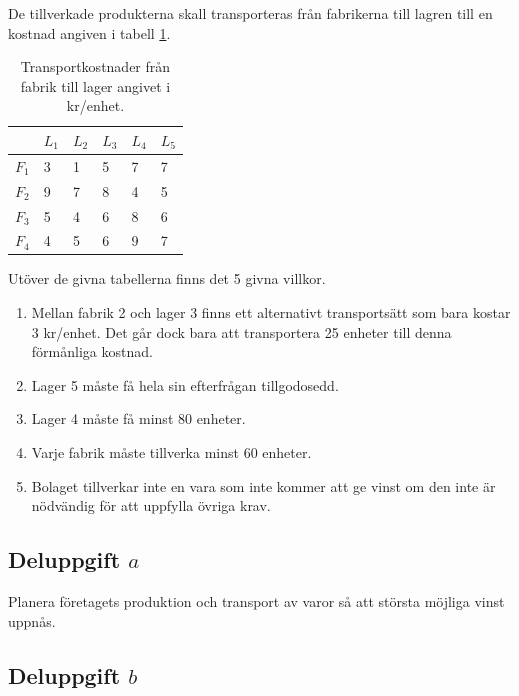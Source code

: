\documentclass[titlepage, a4paper]{article}
\begin{document}
De tillverkade produkterna skall transporteras från fabrikerna till lagren till en kostnad angiven i tabell \ref{transportkostnader}.

\begin{table}[h!]
    \centering
    \begin{tabular}{ | l | l | l | l | l | l | }
        \hline
        {} & {$L_{1}$} & {$L_{2}$} & {$L_{3}$} & {$L_{4}$} & {$L_{5}$} \\\hline
        {$F_{1}$} & {3} & {1} & {5} & {7} & {7} \\\hline
        {$F_{2}$} & {9} & {7} & {8} & {4} & {5} \\\hline
        {$F_{3}$} & {5} & {4} & {6} & {8} & {6} \\\hline
        {$F_{4}$} & {4} & {5} & {6} & {9} & {7} \\\hline
    \end{tabular}
    \caption{Transportkostnader från fabrik till lager angivet i kr/enhet.} \label{transportkostnader}
\end{table}

Utöver de givna tabellerna finns det 5 givna villkor.

\begin{enumerate}
\item{Mellan fabrik 2 och lager 3 finns ett alternativt transportsätt som bara kostar 3 kr/enhet. Det går dock bara att transportera 25 enheter till denna förmånliga kostnad.} \label{bivillkor1}
\item{Lager 5 måste få hela sin efterfrågan tillgodosedd.} \label{bivillkor2}
\item{Lager 4 måste få minst 80 enheter.} \label{bivillkor3}
\item{Varje fabrik måste tillverka minst 60 enheter.} \label{bivillkor4}
\item{Bolaget tillverkar inte en vara som inte kommer att ge vinst om den inte är nödvändig för att uppfylla övriga krav.} \label{bivillkor5}
\end{enumerate}


\subsection{Deluppgift $a$}

Planera företagets produktion och transport av varor så att största möjliga vinst uppnås.

\subsection{Deluppgift $b$}
\end{document}
